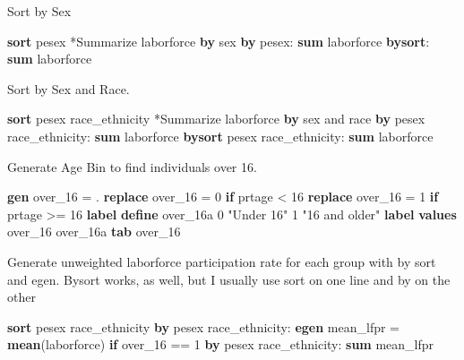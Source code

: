 \documentclass[
]{book}
\newenvironment{Shaded}{\begin{snugshade}}{\end{snugshade}}
\newcommand{\KeywordTok}[1]{\textcolor[rgb]{0.13,0.29,0.53}{\textbf{#1}}}
\newcommand{\NormalTok}[1]{#1}
\newcommand{\StringTok}[1]{\textcolor[rgb]{0.31,0.60,0.02}{#1}}
\begin{document}
Sort by Sex

\begin{Shaded}
\begin{Highlighting}[]
\KeywordTok{sort}\NormalTok{ pesex}
\NormalTok{*Summarize laborforce }\KeywordTok{by}\NormalTok{ sex}
\KeywordTok{by}\NormalTok{ pesex: }\KeywordTok{sum}\NormalTok{ laborforce}
\KeywordTok{bysort}\NormalTok{: }\KeywordTok{sum}\NormalTok{ laborforce}
\end{Highlighting}
\end{Shaded}

Sort by Sex and Race.

\begin{Shaded}
\begin{Highlighting}[]
\KeywordTok{sort}\NormalTok{ pesex race\_ethnicity}
\NormalTok{*Summarize laborforce }\KeywordTok{by}\NormalTok{ sex and race}
\KeywordTok{by}\NormalTok{ pesex race\_ethnicity: }\KeywordTok{sum}\NormalTok{ laborforce}
\KeywordTok{bysort}\NormalTok{ pesex race\_ethnicity: }\KeywordTok{sum}\NormalTok{ laborforce}
\end{Highlighting}
\end{Shaded}

Generate Age Bin to find individuals over 16.

\begin{Shaded}
\begin{Highlighting}[]
\KeywordTok{gen}\NormalTok{ over\_16 = .}
\KeywordTok{replace}\NormalTok{ over\_16 = 0 }\KeywordTok{if}\NormalTok{ prtage \textless{} 16}
\KeywordTok{replace}\NormalTok{ over\_16 = 1 }\KeywordTok{if}\NormalTok{ prtage \textgreater{}= 16}
\KeywordTok{label} \KeywordTok{define}\NormalTok{ over\_16a 0 }\StringTok{"Under 16"}\NormalTok{ 1 }\StringTok{"16 and older"}
\KeywordTok{label} \KeywordTok{values}\NormalTok{ over\_16 over\_16a}
\KeywordTok{tab}\NormalTok{ over\_16}
\end{Highlighting}
\end{Shaded}

Generate unweighted laborforce participation rate for each group with by sort and egen. Bysort works, as well, but I usually use sort on one line and by on the other

\begin{Shaded}
\begin{Highlighting}[]
\KeywordTok{sort}\NormalTok{ pesex race\_ethnicity}
\KeywordTok{by}\NormalTok{ pesex race\_ethnicity: }\KeywordTok{egen}\NormalTok{ mean\_lfpr = }\KeywordTok{mean}\NormalTok{(laborforce) }\KeywordTok{if}\NormalTok{ over\_16 == 1}
\KeywordTok{by}\NormalTok{ pesex race\_ethnicity: }\KeywordTok{sum}\NormalTok{ mean\_lfpr}
\end{Highlighting}
\end{Shaded}
\end{document}

